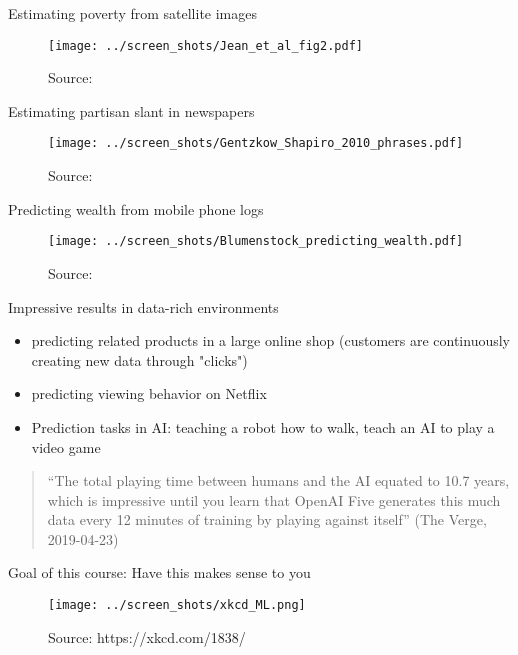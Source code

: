 \documentclass[xcolor=dvipsnames, handout]{beamer}
\begin{document}
\begin{frame}{Estimating poverty from satellite images}
\begin{figure}
  \texttt{[image: ../screen\_shots/Jean\_et\_al\_fig2.pdf]}
   \caption{Source: \textcite{jean2016combining}}
\end{figure}
\end{frame}


\begin{frame}{Estimating partisan slant in newspapers}
\begin{figure}
  \texttt{[image: ../screen\_shots/Gentzkow\_Shapiro\_2010\_phrases.pdf]}
   \caption{Source: \textcite{gentzkow2010drives}}
\end{figure}
\end{frame}


\begin{frame}{Predicting wealth from mobile phone logs}
\begin{figure}
  \texttt{[image: ../screen\_shots/Blumenstock\_predicting\_wealth.pdf]}
   \caption{Source: \textcite{blumenstock2015predicting}}
\end{figure}
\end{frame}



\begin{frame}{Impressive results in data-rich environments}
\begin{itemize}
  \item 
  predicting related products in a large online shop (customers are continuously creating new data through "clicks")
  \item 
  predicting viewing behavior on Netflix
  \item 
  \pause
  Prediction tasks in AI: teaching a robot how to walk, teach an AI to play a video game 
\end{itemize}
\begin{quote}
``The total playing time between humans and the AI equated to 10.7 years, which is impressive until you learn that OpenAI Five generates this much data every 12 minutes of training by playing against itself'' (The Verge, 2019-04-23)
\end{quote}
\end{frame}


\begin{frame}{Goal of this course: Have this makes sense to you}
\begin{figure}
  \texttt{[image: ../screen\_shots/xkcd\_ML.png]}
   \caption{Source: https://xkcd.com/1838/}
\end{figure}
\end{frame}
\end{document}
